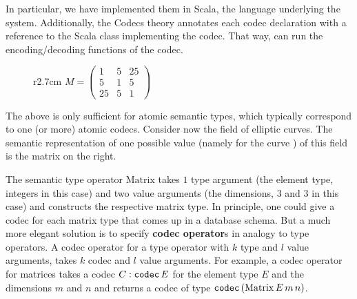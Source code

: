In particular, we have implemented them in Scala, the language underlying the \mmt system.
Additionally, the \textsf{Codecs} theory annotates each codec declaration with a reference to the Scala class implementing the codec.
That way, \mmt can run the encoding/decoding functions of the codec.

\begin{wrapfigure}r{2.7cm}\vspace*{-2em}
$M = \left(
    \begin{array}{ccc}
      1 & 5 & 25 \\
      5 & 1 & 5 \\
      25 & 5 & 1 \end{array} 
  \right)$\vspace*{-1.5em}
\end{wrapfigure}

The above is only sufficient for atomic semantic types, which typically correspond to one (or more) atomic codecs.
Consider now the field  of elliptic curves.
The semantic representation of one possible value (namely for the curve ) of this field is the matrix on the right.

The semantic type operator $\mathrm{Matrix}$ takes $1$ type argument (the element type, integers in this case) and two value arguments (the dimensions, $3$ and $3$ in this case) and constructs the respective matrix type. 
In principle, one could give a codec for each matrix type that comes up in a database schema. 
But a much more elegant solution is to specify \textbf{codec operator}s in analogy to type operators.
A codec operator for a type operator with $k$ type and $l$ value arguments, takes $k$ codec and $l$ value arguments.
For example, a codec operator for matrices takes a codec $C:\codectt\, E$ for the element type $E$ and the dimensions $m$ and $n$ and returns a codec of type $\codectt\,(\mathrm{Matrix}\,E\,m\,n)$.

